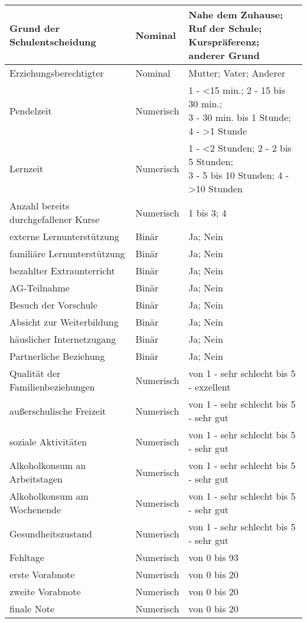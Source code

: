 \begin{table}[!ht]
\begin{tabular}{lll}
        Grund der Schulentscheidung & Nominal & \makecell[l]{Nahe dem Zuhause; Ruf der Schule; \\Kurspräferenz; anderer Grund }\\  \hline
        Erziehungsberechtigter & Nominal & Mutter; Vater; Anderer \\  \hline
        Pendelzeit & Numerisch & \makecell[l]{1 - <15 min.; 2 - 15 bis 30 min.; \\3 - 30 min. bis 1 Stunde; 4 - >1 Stunde} \\  \hline
        Lernzeit & Numerisch & \makecell[l]{1 - <2 Stunden; 2 - 2 bis 5 Stunden; \\3 - 5 bis 10 Stunden; 4 - >10 Stunden }\\  \hline
        Anzahl bereits durchgefallener Kurse & Numerisch & 1 bis 3; 4 \\  \hline
        externe Lernunterstützung & Binär & Ja; Nein \\  \hline
        familiäre Lernunterstützung & Binär & Ja; Nein \\  \hline
        bezahlter Extraunterricht & Binär & Ja; Nein \\  \hline
        AG-Teilnahme & Binär & Ja; Nein \\  \hline
        Besuch der Vorschule & Binär & Ja; Nein \\  \hline
        Absicht zur Weiterbildung & Binär & Ja; Nein \\ \hline
        häuslicher Internetzugang & Binär & Ja; Nein \\ \hline
        Partnerliche Beziehung & Binär & Ja; Nein \\ \hline
        Qualität der Familienbeziehungen & Numerisch & von 1 - sehr schlecht bis 5 - exzellent\\ \hline
        außerschulische Freizeit & Numerisch & von 1 - sehr schlecht bis 5 - sehr gut \\ \hline
        soziale Aktivitäten & Numerisch & von 1 - sehr schlecht bis 5 - sehr gut \\ \hline
        Alkoholkonsum an Arbeitstagen & Numerisch & von 1 - sehr schlecht bis 5 - sehr gut \\ \hline
        Alkoholkonsum am Wochenende & Numerisch & von 1 - sehr schlecht bis 5 - sehr gut \\ \hline
        Gesundheitszustand & Numerisch & von 1 - sehr schlecht bis 5 - sehr gut\\ \hline
        Fehltage & Numerisch & von 0 bis 93 \\ \hline
        erste Vorabnote & Numerisch & von 0 bis 20 \\ \hline
        zweite Vorabnote & Numerisch & von 0 bis 20 \\ \hline
        finale Note & Numerisch & von 0 bis 20 \\ \hline
    \hline
    \end{tabular}
\end{table}

